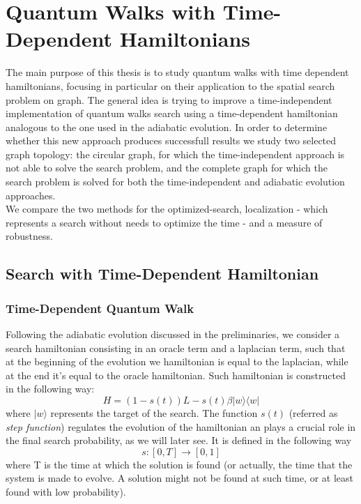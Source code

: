 \newpage
\thispagestyle{empty}
\chapter{Quantum Walks with Time-Dependent Hamiltonians}
The main purpose of this thesis is to study quantum walks with time dependent hamiltonians, focusing in particular on their application to the spatial search problem on graph. The general idea is trying to improve a time-independent implementation of quantum walks search using a time-dependent hamiltonian analogous to the one used in the adiabatic evolution. In order to determine whether this new approach produces successfull results we study two selected graph topology: the circular graph, for which the time-independent approach is not able to solve the search problem, and the complete graph for which the search problem is solved for both the time-independent and adiabatic evolution approaches. \\ We compare the two methods for the optimized-search, localization - which represents a search without needs to optimize the time - and a measure of robustness. 

\section{Search with Time-Dependent Hamiltonian}

    \subsection{Time-Dependent Quantum Walk}
        Following the adiabatic evolution discussed in the preliminaries, we consider a search hamiltonian consisting in an oracle term and a laplacian term, such that at the beginning of the evolution we hamiltonian is equal to the laplacian, while at the end it's equal to the oracle hamiltonian. Such hamiltonian is constructed in the following way:
          \begin{equation}
            H = (1-s(t))L - s(t)\beta|w\rangle\langle w|
          \end{equation}
        where $|w\rangle$ represents the target of the search.
        The function $s(t)$ (referred as \textit{step function}) regulates the evolution of the hamiltonian an plays a  crucial role in the final search probability, as we will later see. It is defined in the following way
          \begin{equation}
            s: [0,T] \rightarrow [0,1]
          \end{equation}
        where T is the time at which the solution is found (or actually, the time that the system is made to evolve. A solution might not be found at such time, or at least found with low probability).


